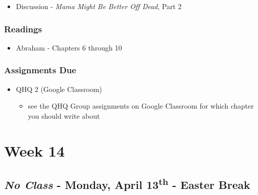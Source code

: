 \documentclass[]{book}
\providecommand{\tightlist}{%
  \setlength{\itemsep}{0pt}\setlength{\parskip}{0pt}}
\begin{document}
\begin{itemize}
\tightlist
\item
  Discussion - \emph{Mama Might Be Better Off Dead}, Part 2
\end{itemize}

\hypertarget{readings-21}{%
\subsubsection*{Readings}\label{readings-21}}

\begin{itemize}
\tightlist
\item
  Abraham - Chapters 6 through 10
\end{itemize}

\hypertarget{assignments-due-4}{%
\subsubsection*{Assignments Due}\label{assignments-due-4}}

\begin{itemize}
\tightlist
\item
  QHQ 2 (Google Classroom)

  \begin{itemize}
  \tightlist
  \item
    see the QHQ Group assignments on Google Classroom for which chapter you should write about
  \end{itemize}
\end{itemize}

\newpage

\hypertarget{week-14}{%
\section*{Week 14}\label{week-14}}

\hypertarget{no-class---monday-april-13th---easter-break}{%
\subsection*{\texorpdfstring{\emph{No Class} - Monday, April 13\textsuperscript{th} - Easter Break}{No Class - Monday, April 13th - Easter Break}}\label{no-class---monday-april-13th---easter-break}}
\end{document}
